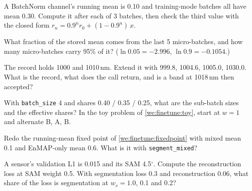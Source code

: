 \begin{checkyourself}
\item\label{ex:finetune:1} A BatchNorm channel's running mean is 0.10 and training-mode batches all have mean 0.30. Compute it after each of 3 batches, then check
  the third value with the closed form $r_n = 0.9^n r_0 + (1 - 0.9^n)\,x$.
\item\label{ex:finetune:2} What fraction of the stored mean comes from the last 5 micro-batches, and how many micro-batches carry 95\% of it? ($\ln 0.05 = -2.996$,
  $\ln 0.9 = -0.1054$.)
\item\label{ex:finetune:3} The record holds 1000 and 1010\,nm. Extend it with 999.8, 1004.6, 1005.0, 1030.0. What is the record, what does the call return, and is a
  band at 1018\,nm then accepted?
\item\label{ex:finetune:4} With \texttt{batch\_size} 4 and shares 0.40 / 0.35 / 0.25, what are the sub-batch sizes and the effective shares? In the toy problem of
  \cref{we:finetune:toy}, start at $w = 1$ and alternate B, A, B.
\item\label{ex:finetune:5} Redo the running-mean fixed point of \cref{we:finetune:fixedpoint} with mixed mean 0.1 and EnMAP-only mean 0.6. What is it with
  \texttt{segment\_mixed}?
\item\label{ex:finetune:6} A sensor's validation L1 is 0.015 and its SAM 4.5$^\circ$. Compute the reconstruction loss at SAM weight 0.5. With segmentation loss 0.3
  and reconstruction 0.06, what share of the loss is segmentation at $w_s = 1.0$, 0.1 and 0.2?
\end{checkyourself}

\endgroup
